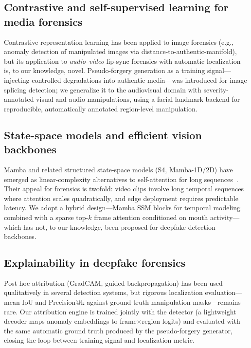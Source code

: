 \documentclass[sn-basic,Numbered,referee]{sn-jnl}
\begin{document}
\subsection{Contrastive and self-supervised learning for media forensics}

Contrastive representation learning has been applied to image forensics (e.g., anomaly detection of manipulated images via distance-to-authentic-manifold), but its application to \emph{audio--video} lip-sync forensics with automatic localization is, to our knowledge, novel. Pseudo-forgery generation as a training signal---injecting controlled degradations into authentic media---was introduced for image splicing detection; we generalize it to the audiovisual domain with severity-annotated visual and audio manipulations, using a facial landmark backend for reproducible, automatically annotated region-level manipulation.

\subsection{State-space models and efficient vision backbones}

Mamba and related structured state-space models (S4, Mamba-1D/2D) have emerged as linear-complexity alternatives to self-attention for long sequences~\cite{gu2024mamba,dao2024transformers}. Their appeal for forensics is twofold: video clips involve long temporal sequences where attention scales quadratically, and edge deployment requires predictable latency. We adopt a hybrid design---Mamba SSM blocks for temporal modeling combined with a sparse top-$k$ frame attention conditioned on mouth activity---which has not, to our knowledge, been proposed for deepfake detection backbones.

\subsection{Explainability in deepfake forensics}

Post-hoc attribution (GradCAM, guided backpropagation) has been used qualitatively in several detection systems, but rigorous localization evaluation---mean IoU and Precision@k against ground-truth manipulation masks---remains rare. Our attribution engine is trained jointly with the detector (a lightweight decoder maps anomaly embeddings to frame$\times$region logits) and evaluated with the same automatic ground truth produced by the pseudo-forgery generator, closing the loop between training signal and localization metric.
\end{document}
